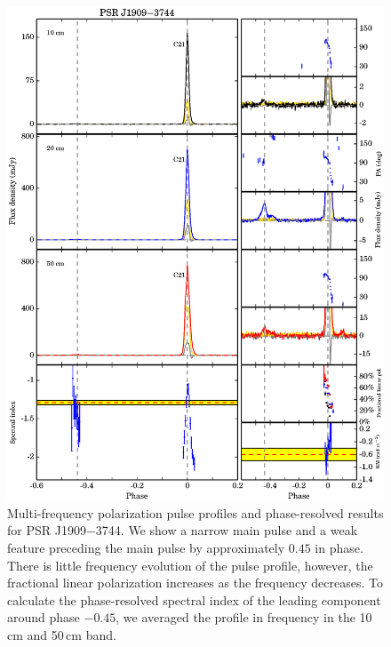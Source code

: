 \documentclass[useAMS,usenatbib]{mn2e}
\begin{document}
\begin{appendix}
\begin{figure}
\begin{center}
\includegraphics[width=6 in]{1909.ps}
\caption{Multi-frequency polarization pulse profiles and phase-resolved results for PSR J1909$-$3744. 
We show a narrow main pulse and a weak feature preceding the main pulse by 
approximately $0.45$ in phase.
%
There is little frequency evolution of the pulse profile, however, the fractional 
linear polarization increases as the frequency decreases.
%
To calculate the phase-resolved spectral index of the leading component
around phase $-0.45$, we averaged the profile in frequency in the 10\,cm 
and 50\,cm band.
}
\label{1909}
\end{center}
\end{figure}


\end{appendix}
\end{document}
